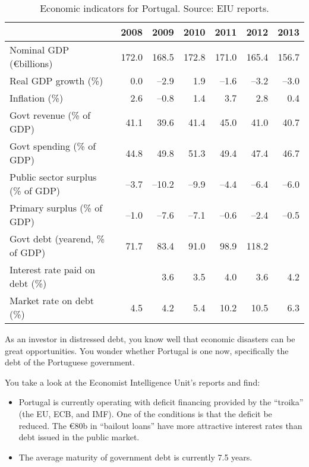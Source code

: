\documentclass[letterpaper,12pt]{exam}
\begin{document}
\begin{questions}
\begin{table}[h]
\centering
{\small
\begin{tabular}{lrrrrrr}
\toprule
        & 2008 & 2009 & 2010 & 2011 & 2012 & 2013 \\
\midrule
Nominal GDP (\euro billions) & 172.0 & 168.5 & 172.8 & 171.0 & 165.4 & 156.7 \\
Real GDP growth (\%) & 0.0 & --2.9 & 1.9 & --1.6 & --3.2 & --3.0 \\
Inflation (\%) & 2.6 & --0.8 & 1.4 & 3.7 & 2.8 & 0.4 \\
Govt revenue (\% of GDP)  & 41.1 & 39.6 & 41.4 & 45.0 & 41.0 & 40.7 \\
Govt spending (\% of GDP) & 44.8 & 49.8 & 51.3 & 49.4 & 47.4 & 46.7  \\
Public sector surplus (\% of GDP) & --3.7 & --10.2 & --9.9 & --4.4 & --6.4 & --6.0\\
Primary surplus (\% of GDP)  & --1.0 & --7.6 &  --7.1 & --0.6 & --2.4 & --0.5   \\
Govt debt (yearend, \% of GDP) & 71.7 & 83.4 & 91.0 & 98.9 & 118.2 \\
Interest rate paid on debt (\%) &  & 3.6 & 3.5 & 4.0 & 3.6	& 4.2 \\
Market rate on debt (\%)        & 4.5 & 4.2 & 5.4 & 10.2 & 10.5 & 6.3 \\
\bottomrule
\end{tabular}
}
\label{tab:portugal}
\caption{Economic indicators for Portugal.  Source:  EIU reports.}
\end{table}

As an investor in distressed debt,
you know well that economic disasters can be great opportunities.
You wonder whether Portugal is one now, specifically
the debt of the Portuguese government.

You take a look at the Economist Intelligence Unit's reports
and find:
\begin{itemize}
\item Portugal is currently operating with deficit financing
provided by the ``troika'' (the EU, ECB, and IMF).
One of the conditions is that the deficit be reduced.
The \euro 80b in ``bailout loans'' have more attractive interest rates
than debt issued in the public market.

\item The average maturity of government debt is currently 7.5 years.


\end{itemize}
\end{questions}
\end{document}
